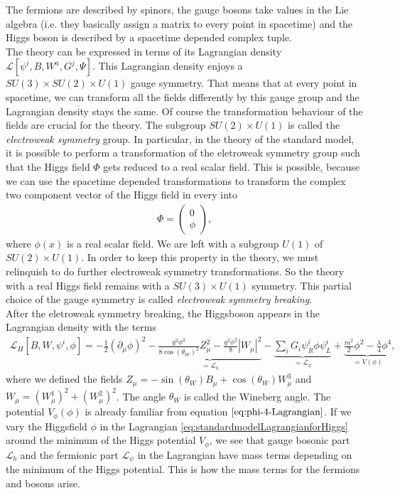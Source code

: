 \documentclass{article}
\numberwithin{equation}{section}
\begin{document}
The fermions are described by spinors, the gauge bosons take values in the Lie algebra (i.e. they basically assign a matrix to every point in spacetime) and the Higgs boson is described by a spacetime depended complex  tuple. \\
The theory can be expressed in terms of its Lagrangian density $\mathcal{L}[\psi^{i}, B, W^{a}, G^{j}, \Psi]$. This Lagrangian density enjoys a $SU(3) \times SU(2) \times U(1)$ gauge symmetry. 
That means that at every point in spacetime, we can transform  all the fields differently by this gauge group and the Lagrangian density stays the same. Of course the transformation behaviour of the fields are crucial for the theory. The subgroup $SU(2)\times U(1)$ is called the \textit{electroweak symmetry} group. In particular, in the theory of the standard model, it is possible to perform a transformation of the eletroweak symmetry group such that the Higgs field $\Phi$ gets reduced to a real scalar field. This is possible, because we can use the spacetime depended transformations to transform the complex two component vector of the Higgs field in every into 
\begin{align*}
    \Phi = \begin{pmatrix} 0 \\ \phi\end{pmatrix}, 
\end{align*}
where $\phi(x)$ is a real scalar field. We are left with a subgroup $U(1)$ of $SU(2) \times U(1)$. 
In order to keep this property in the theory, we must relinquish to do further electroweak symmetry transformations. So the theory with a real Higgs field remains with a $SU(3) \times U(1)$ symmetry. This partial choice of the gauge symmetry is called \textit{electroweak symmetry breaking}. \\
After the eletroweak symmetry breaking, the Higgsboson appears in the Lagrangian density with the terms
\begin{align}
    \mathcal{L}_H[B, W, \psi^{i}, \phi] = -\frac{1}{2}(\partial_{\mu} \phi)^2 -\underbrace{\frac{g^2\phi^2}{8 \cos(\theta_{W})^2} Z_{\mu}^2-\frac{g^2 \phi^2}{8}|W_{\mu}|^2 }_{=\mathcal{L}_b } - \underbrace{\sum_{i}G_i\psi^{i}_R \phi \psi^{i}_L}_{=\mathcal{L}_{\psi}}+\underbrace{\frac{m^2}{2}\phi^2-\frac{\lambda}{4}\phi^4}_{ = V(\phi)} ,
    \label{eq:standardmodelLagrangianforHiggs}
\end{align}
where we defined the fields $Z_{\mu}  = -\sin(\theta_W)B_{\mu} + \cos(\theta_W)W^{3}_{\mu}$ and $W_{\mu} = (W^1_{\mu})^2 + (W^2_{\mu})^2$. The angle $\theta_W$ is called the Wineberg angle. The potential $V_{\phi}(\phi)$ is already familiar from equation $\eqref{eq:phi-4-Lagrangian}$. If we vary the Higgsfield $\phi$ in the Lagrangian \eqref{eq:standardmodelLagrangianforHiggs} around the minimum of the Higgs potential $V_{\phi}$, we see that gauge bosonic part $\mathcal{L}_{b}$ and the fermionic part $\mathcal{L}_{\psi}$ in the Lagrangian have mass terms depending on the minimum of the Higgs potential. This is how the mass terms for the fermions and bosons arise. \\
\end{document}
